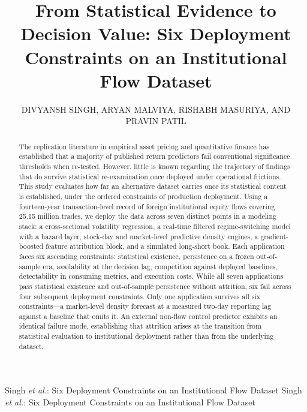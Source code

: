 \documentclass{ieeeaccess}
\begin{document}

\title{From Statistical Evidence to Decision Value: Six Deployment Constraints on an Institutional Flow Dataset}

\author{\uppercase{Divyansh Singh},
\uppercase{Aryan Malviya},
\uppercase{Rishabh Masuriya},
\uppercase{and Pravin Patil}}
\address[1]{Department of Artificial Intelligence and Data Science, K.~J.~Somaiya Institute of Technology, Mumbai 400077, India (e-mail: divyansh26@somaiya.edu; aryan.malviya@somaiya.edu; rishabh.masuria@somaiya.edu; pravin.patil@somaiya.edu)}

\markboth
{Singh \MakeLowercase{\textit{et al.}}: Six Deployment Constraints on an Institutional Flow Dataset}
{Singh \MakeLowercase{\textit{et al.}}: Six Deployment Constraints on an Institutional Flow Dataset}


\begin{abstract}
The replication literature in empirical asset pricing and quantitative finance has established that a majority of published return predictors fail conventional significance thresholds when re-tested. However, little is known regarding the trajectory of findings that do survive statistical re-examination once deployed under operational frictions. This study evaluates how far an alternative dataset carries once its statistical content is established, under the ordered constraints of production deployment. Using a fourteen-year transaction-level record of foreign institutional equity flows covering 25.15 million trades, we deploy the data across seven distinct points in a modeling stack: a cross-sectional volatility regression, a real-time filtered regime-switching model with a hazard layer, stock-day and market-level predictive density engines, a gradient-boosted feature attribution block, and a simulated long-short book. Each application faces six ascending constraints: statistical existence, persistence on a frozen out-of-sample era, availability at the decision lag, competition against deployed baselines, detectability in consuming metrics, and execution costs. While all seven applications pass statistical existence and out-of-sample persistence without attrition, six fail across four subsequent deployment constraints. Only one application survives all six constraints---a market-level density forecast at a measured two-day reporting lag against a baseline that omits it. An external non-flow control predictor exhibits an identical failure mode, establishing that attrition arises at the transition from statistical evaluation to institutional deployment rather than from the underlying dataset.
\end{abstract}
\end{document}
